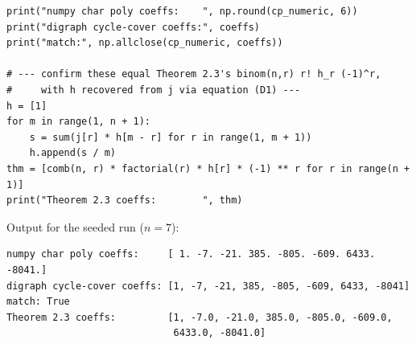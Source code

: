 \documentclass[11pt, fleqn]{amsart}
\theoremstyle{remark}
\begin{document}
\begin{lstlisting}
print("numpy char poly coeffs:    ", np.round(cp_numeric, 6))
print("digraph cycle-cover coeffs:", coeffs)
print("match:", np.allclose(cp_numeric, coeffs))

# --- confirm these equal Theorem 2.3's binom(n,r) r! h_r (-1)^r,
#     with h recovered from j via equation (D1) ---
h = [1]
for m in range(1, n + 1):
    s = sum(j[r] * h[m - r] for r in range(1, m + 1))
    h.append(s / m)
thm = [comb(n, r) * factorial(r) * h[r] * (-1) ** r for r in range(n + 1)]
print("Theorem 2.3 coeffs:        ", thm)
\end{lstlisting}

\noindent
Output for the seeded run ($n = 7$):
\begin{lstlisting}[language={}]
numpy char poly coeffs:     [ 1. -7. -21. 385. -805. -609. 6433. -8041.]
digraph cycle-cover coeffs: [1, -7, -21, 385, -805, -609, 6433, -8041]
match: True
Theorem 2.3 coeffs:         [1, -7.0, -21.0, 385.0, -805.0, -609.0,
                             6433.0, -8041.0]
\end{lstlisting}
\end{document}
